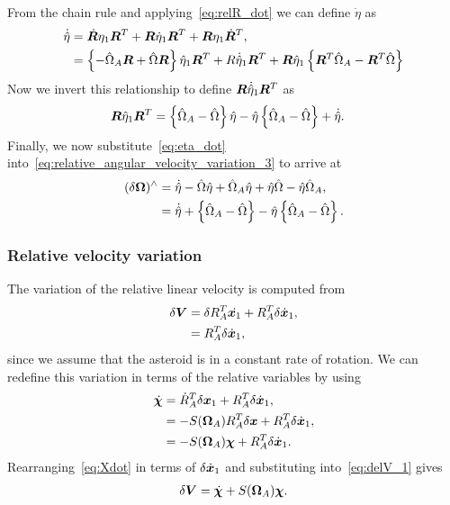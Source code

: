 From the chain rule and applying~\cref{eq:relR_dot} we can define \( \dot{\eta} \) as
\begin{align}\label{eq:eta_dot_1}
    \dot{\hat{\eta}} &= \dot{\bm{R}} \eta_1 \bm{R}^T + \bm{R} \dot{\eta}_1 \bm{R}^T + \bm{R} \eta_1 \dot{\bm{R}}^T , \nonumber\\
                     &= \left\{ - \hat{\Omega}_A \bm{R} + \hat{\Omega} \bm{R} \right\} \hat{\eta}_1 \bm{R}^T + R \dot{\hat{\eta}}_1 \bm{R}^T + \bm{R} \hat{\eta}_1 \left\{ \bm{R}^T \hat{\Omega}_A - \bm{R}^T \hat{\Omega} \right\}
\end{align}
Now we invert this relationship to define \( \bm{R} \dot{\hat{\eta}}_1 \bm{R}^T \) as
\begin{align}\label{eq:eta_dot}
    \bm{R} \hat{\eta}_1 \bm{R}^T &= \left\{ \hat{\Omega}_A - \hat{\Omega} \right\} \hat{\eta} - \hat{\eta} \left\{ \hat{\Omega}_A - \hat{\Omega} \right\} + \dot{\hat{\eta}} .
\end{align}
Finally, we now substitute~\cref{eq:eta_dot} into~\cref{eq:relative_angular_velocity_variation_3} to arrive at
\begin{align}\label{eq:rel_ang_vel_var}
    (\delta \bm{\Omega})^\wedge &= \dot{\hat{\eta}} - \hat{\Omega} \hat{\eta} + \hat{\Omega}_A \hat{\eta} + \hat{\eta} \hat{\Omega} - \hat{\eta} \hat{\Omega}_A , \\
                                   &= \dot{\hat{\eta}} + \left\{ \hat{\Omega}_A - \hat{\Omega} \right\} - \hat{\eta} \left\{ \hat{\Omega}_A - \hat{\Omega} \right\} . 
\end{align}
\subsubsection{Relative velocity variation}
The variation of the relative linear velocity is computed from 
\begin{align}\label{eq:delV_1}
    \delta \bm{V} &= \delta R_A^T \dot{\bm{x}_1} + R_A^T \delta \dot{\bm{x}}_1 , \nonumber \\
    &= R_A^T \delta \dot{\bm{x}}_1 ,
\end{align}
since we assume that the asteroid is in a constant rate of rotation.
We can redefine this variation in terms of the relative variables by using
\begin{align}\label{eq:Xdot}
    \dot{\bm{\chi}} &= \dot{R}_A^T \delta \bm{x}_1 + R_A^T \delta \dot{\bm{x}}_1 , \nonumber \\
    &= -S(\bm{\Omega}_A) R_A^T \delta \bm{x} + R_A^T \delta \dot{\bm{x}}_1 ,\nonumber \\
    &= -S(\bm{\Omega}_A) \bm{\chi} + R_A^T \delta \dot{\bm{x}}_1 .
\end{align}
Rearranging~\cref{eq:Xdot} in terms of \( \delta \dot{\bm{x}}_1\) and substituting into~\cref{eq:delV_1} gives
\begin{align}\label{eq:relative_velocity_variation}
    \delta \bm{V} = \dot{\bm{\chi}} + S(\bm{\Omega}_A) \bm{\chi} .
\end{align}

